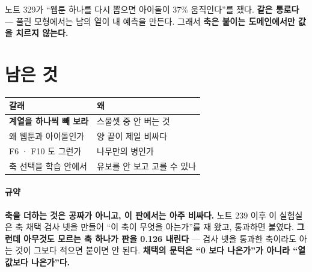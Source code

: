 \documentclass[10pt]{article}
\begin{document}
노트 329가 ``웹툰 하나를 다시 뽑으면 아이돌이 37\% 움직인다''를 쟀다.
\textbf{같은 통로다} --- 풀린 모형에서는 남의 열이 내 예측을 만든다.
그래서 \textbf{축은 붙이는 도메인에서만 값을 치르지 않는다.}

\section{남은 것}
\begin{center}\footnotesize
\begin{tabular}{ll}
\hline
갈래 & 왜 \\
\hline
\textbf{계열을 하나씩 빼 보라} & 스물셋 중 안 버는 것 \\
왜 웹툰과 아이돌인가 & 양 끝이 제일 비싸다 \\
F6 · F10 도 그런가 & 나무만의 병인가 \\
축 선택을 학습 안에서 & 유보를 안 보고 고를 수 있나 \\
\hline
\end{tabular}
\end{center}

\paragraph{규약} \textbf{축을 더하는 것은 공짜가 아니고, 이 판에서는 아주
비싸다.} 노트 239 이후 이 실험실은 축 채택 검사 넷을 만들어 ``이 축이
무엇을 아는가''를 재 왔고, 통과하면 붙였다. \textbf{그런데 아무것도 모르는
축 하나가 판을 0.126 내린다} --- 검사 넷을 통과한 축이라도 아는 것이 그보다
적으면 붙이면 안 된다. \textbf{채택의 문턱은 ``0 보다 나은가''가 아니라
``열값보다 나은가''다.}
\end{document}
